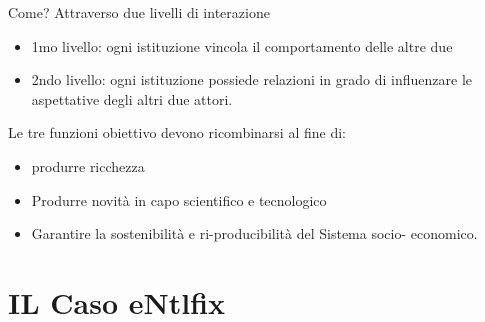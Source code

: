 \documentclass{article}
\begin{document}
Come? Attraverso due livelli di interazione
\begin{itemize}
	\item 1mo livello: ogni istituzione vincola il comportamento delle altre due
	\item 2ndo livello: ogni istituzione possiede relazioni in grado di influenzare le
	aspettative degli altri due attori. 
\end{itemize}

Le tre funzioni obiettivo devono
ricombinarsi al fine di:
\begin{itemize}
	\item	produrre ricchezza
	\item Produrre novità in capo scientifico e tecnologico
	\item Garantire la sostenibilità e ri-producibilità del Sistema socio-
	economico.
\end{itemize}


\section{IL Caso eNtlfix}
\end{document}
